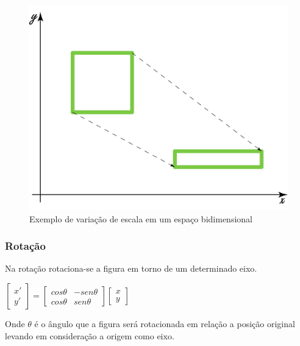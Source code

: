 \documentclass[9pt, a4paper, nofonttune, journal]{IEEEtran}
\begin{document}
\begin{figure}[H]
\begin{center}
\includegraphics[scale=0.25]{figuras/scale1}
\caption{Exemplo de variação de escala em um espaço bidimensional}
\end{center}
\end{figure}

\subsubsection{Rotação}
Na rotação rotaciona-se a figura em torno de um determinado eixo.

\begin{center}
$\begin{bmatrix}x'\\
y'
\end{bmatrix}=\begin{bmatrix}cos\theta & -sen\theta\\
cos\theta & sen\theta
\end{bmatrix}\begin{bmatrix}x\\
y
\end{bmatrix}$\end{center}
Onde $\theta$ é o ângulo que a figura será rotacionada em relação a posição original levando em consideração a origem como eixo. \cite{CGPPBook1}
\end{document}
